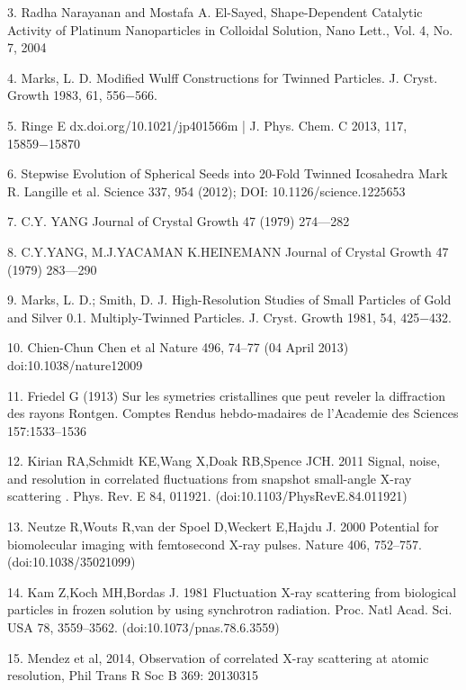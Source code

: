 \documentclass [11pt,fleqn]{article}
\def \be {\begin{equation}}
\def \ee {\end{equation}}
\begin{document}
3. Radha Narayanan and Mostafa A. El-Sayed, Shape-Dependent Catalytic Activity of Platinum Nanoparticles in Colloidal Solution, Nano Lett., Vol. 4, No. 7, 2004

4. Marks, L. D. Modified Wulff Constructions for Twinned Particles. J. Cryst. Growth 1983, 61, 556−566.

5. Ringe E dx.doi.org/10.1021/jp401566m | J. Phys. Chem. C 2013, 117, 15859−15870

6. Stepwise Evolution of Spherical Seeds into 20-Fold Twinned Icosahedra Mark R. Langille et al. Science 337, 954 (2012); DOI: 10.1126/science.1225653

7. C.Y. YANG Journal of Crystal Growth 47 (1979) 274—282

8. C.Y.YANG, M.J.YACAMAN K.HEINEMANN Journal of Crystal Growth 47 (1979) 283—290

9. Marks, L. D.; Smith, D. J. High-Resolution Studies of Small Particles of Gold and Silver 0.1. Multiply-Twinned Particles. J. Cryst. Growth 1981, 54, 425−432.

10. Chien-Chun Chen et al Nature 496, 74–77 (04 April 2013) doi:10.1038/nature12009

11. Friedel G (1913) Sur les symetries cristallines que peut reveler la diffraction des rayons Rontgen. Comptes Rendus hebdo-madaires de l’Academie des Sciences 157:1533–1536

12. Kirian RA,Schmidt KE,Wang X,Doak RB,Spence JCH. 2011 Signal, noise, and resolution in correlated fluctuations from snapshot small-angle X-ray scattering . Phys. Rev. E 84, 011921. (doi:10.1103/PhysRevE.84.011921)

13. Neutze R,Wouts R,van der Spoel D,Weckert E,Hajdu J. 2000 Potential for biomolecular imaging with femtosecond X-ray pulses. Nature 406, 752–757. (doi:10.1038/35021099)


14. Kam Z,Koch MH,Bordas J. 1981 Fluctuation X-ray scattering from biological particles in frozen solution by using synchrotron radiation. Proc. Natl Acad. Sci. USA 78, 3559–3562. (doi:10.1073/pnas.78.6.3559)

15. Mendez et al, 2014,  Observation of correlated X-ray scattering at atomic resolution, Phil Trans R Soc B 369: 20130315




\end{document}

